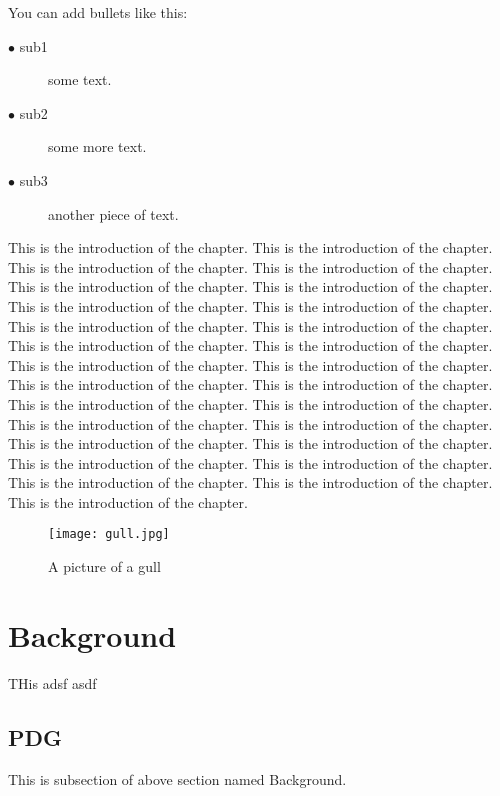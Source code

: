 \documentclass{nithreport}
\begin{document}
You can add bullets like this:
\begin{description}
  \item[$\bullet$ sub1] some text.
  \item[$\bullet$ sub2] some more text.
  \item[$\bullet$ sub3] another piece of text.
\end{description}

This is the introduction of the chapter. This is the introduction of the chapter. This is the introduction of the chapter. This is the introduction of the chapter. This is the introduction of the chapter. This is the introduction of the chapter. This is the introduction of the chapter.\cite{big} This is the introduction of the chapter. This is the introduction of the chapter. This is the introduction of the chapter. This is the introduction of the chapter. This is the introduction of the chapter. This is the introduction of the chapter. This is the introduction of the chapter. This is the introduction of the chapter. This is the introduction of the chapter. This is the introduction of the chapter. This is the introduction of the chapter. This is the introduction of the chapter. This is the introduction of the chapter. This is the introduction of the chapter. This is the introduction of the chapter. This is the introduction of the chapter. This is the introduction of the chapter. This is the introduction of the chapter. This is the introduction of the chapter. This is the introduction of the chapter.

\begin{figure}
  \centering %
  \texttt{[image: gull.jpg]}
  \caption{A picture of a gull}
\end{figure}

\section{Background}
THis adsf asdf

\subsection{PDG}
This is subsection of above section named Background.
\end{document}
